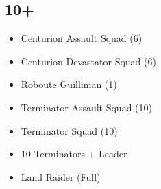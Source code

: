 \documentclass{HordeModeTarot}
\begin{document}
\begin{multicols}{2}
\subsection*{10+}
\begin{itemize}[leftmargin=*]
\item[] Centurion Assault Squad (6)
\item[] Centurion Devastator Squad (6)
\item[] Roboute Guilliman (1)
\item[] Terminator Assault Squad (10)
\item[] Terminator Squad (10)
\item[] 10 Terminators + Leader
\item[] Land Raider (Full)
\end{itemize}

\end{multicols}
\end{document}
